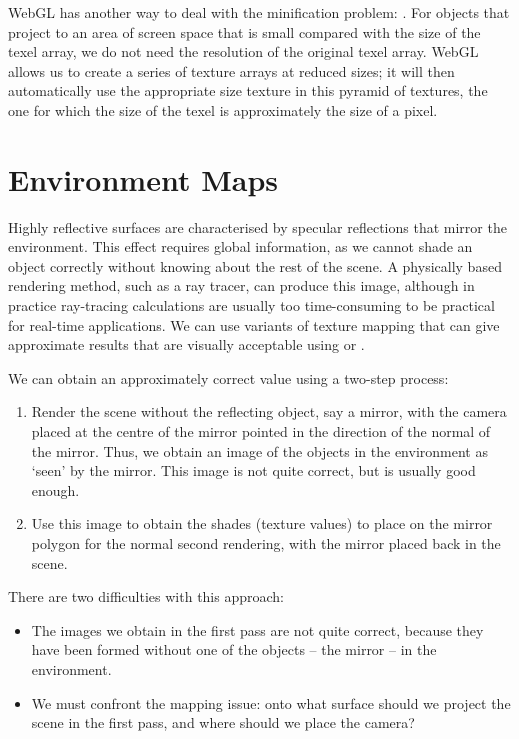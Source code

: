 \documentclass[../COS3712_Notes.tex]{subfiles}
\begin{document}
        WebGL has another way to deal with the minification problem: .
        For objects that project to an area of screen space that is small compared with the size
        of the texel array, we do not need the resolution of the original texel array.
        WebGL allows us to create a series of texture arrays at reduced sizes;
        it will then automatically use the appropriate size texture in this pyramid of textures,
        the one for which the size of the texel is approximately the size of a pixel.

    \section{Environment Maps}
      Highly reflective surfaces are characterised by specular reflections that mirror the
      environment.
      This effect requires global information, as we cannot shade an object correctly without
      knowing about the rest of the scene.
      A physically based rendering method, such as a ray tracer, can produce this image,
      although in practice ray-tracing calculations are usually too time-consuming to be
      practical for real-time applications.
      We can use variants of texture mapping that can give approximate results that are
      visually acceptable using  or .

      We can obtain an approximately correct value using a two-step process:
      \begin{enumerate}
        \item Render the scene without the reflecting object, say a mirror,
          with the camera placed at the centre of the mirror
          pointed in the direction of the normal of the mirror.
          Thus, we obtain an image of the objects in the environment as `seen' by the mirror.
          This image is not quite correct, but is usually good enough.
        \item Use this image to obtain the shades (texture values) to place on the mirror polygon
          for the normal second rendering, with the mirror placed back in the scene.
      \end{enumerate}

      There are two difficulties with this approach:
      \begin{itemize}
        \item The images we obtain in the first pass are not quite correct,
          because they have been formed without one of the objects -- the mirror --
          in the environment.
        \item We must confront the mapping issue: onto what surface should we project
          the scene in the first pass, and where should we place the camera?
      \end{itemize}
\end{document}
